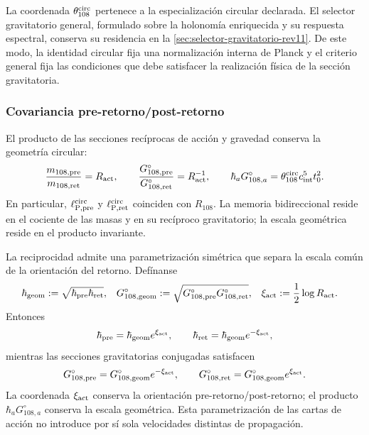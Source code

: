 La coordenada \(\theta_{108}^{\rm circ}\) pertenece a la especialización
circular declarada. El selector gravitatorio general, formulado sobre la
holonomía enriquecida y su respuesta espectral, conserva su residencia en
la \cref{sec:selector-gravitatorio-rev11}. De este modo, la identidad
circular fija una normalización interna de Planck y el criterio general
fija las condiciones que debe satisfacer la realización física de la
sección gravitatoria.

\subsubsection{Covariancia pre-retorno/post-retorno}

El producto de las secciones recíprocas de acción y gravedad conserva la
geometría circular:
\begin{equation}
 \frac{m_{108,\rm pre}}{m_{108,\rm ret}}=R_{\rm act},
 \qquad
 \frac{G_{108,\rm pre}^{\circ}}{G_{108,\rm ret}^{\circ}}
 =R_{\rm act}^{-1},
 \qquad
 \hbar_a G_{108,a}^{\circ}
 =\theta_{108}^{\rm circ}c_{\rm int}^{5}t_0^2.
 \label{eq:planck-ct108-covariancia-pre-ret-rev3}
\end{equation}
En particular, \(\ell_{{\rm P},\rm pre}^{\rm circ}\) y
\(\ell_{{\rm P},\rm ret}^{\rm circ}\) coinciden con \(R_{108}\). La memoria
bidireccional reside en el cociente de las masas y en su recíproco
gravitatorio; la escala geométrica reside en el producto invariante.

La reciprocidad admite una parametrización simétrica que separa la escala
común de la orientación del retorno. Defínanse
\begin{equation}
 \begin{aligned}
 \hbar_{\rm geom}
 &:=\sqrt{\hbar_{\rm pre}\hbar_{\rm ret}},
 &
 G_{108,\rm geom}^{\circ}
 &:=\sqrt{G_{108,\rm pre}^{\circ}G_{108,\rm ret}^{\circ}},
 &
 \xi_{\rm act}&:=\frac12\log R_{\rm act}.
 \end{aligned}
 \label{eq:planck-ct108-parametrizacion-simetrica-rev3}
\end{equation}
Entonces
\[
 \hbar_{\rm pre}=\hbar_{\rm geom}e^{\xi_{\rm act}},
 \qquad
 \hbar_{\rm ret}=\hbar_{\rm geom}e^{-\xi_{\rm act}},
\]
mientras las secciones gravitatorias conjugadas satisfacen
\[
 G_{108,\rm pre}^{\circ}
 =G_{108,\rm geom}^{\circ}e^{-\xi_{\rm act}},
 \qquad
 G_{108,\rm ret}^{\circ}
 =G_{108,\rm geom}^{\circ}e^{\xi_{\rm act}}.
\]
La coordenada \(\xi_{\rm act}\) conserva la orientación
pre-retorno/post-retorno; el producto \(\hbar_aG_{108,a}^{\circ}\)
conserva la escala geométrica. Esta parametrización de las cartas de acción
no introduce por sí sola velocidades distintas de propagación.

